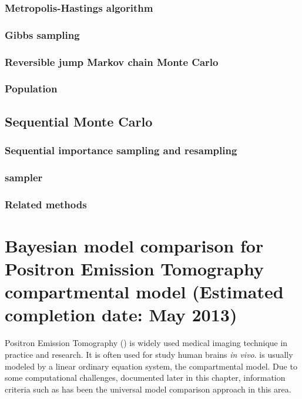 \documentclass[11pt, bib, fontset = Minion]{marticle}
\def\finish#1{(Estimated completion date: #1 2013)}
\begin{document}
\subsubsection{Metropolis-Hastings algorithm}

\subsubsection{Gibbs sampling}

\subsubsection{Reversible jump Markov chain Monte Carlo}

\subsubsection{Population \mcmc}

\subsection{Sequential Monte Carlo}

\subsubsection{Sequential importance sampling and resampling}

\subsubsection{\smc sampler}

\subsubsection{Related methods}

\section{Bayesian model comparison for Positron Emission Tomography
  compartmental model \finish{May}}

Positron Emission Tomography (\pet) is widely used medical imaging technique
in practice and research. It is often used for study human brains \emph{in
  vivo}. \pet is usually modeled by a linear ordinary equation system, the
compartmental model. Due to some computational challenges, documented later in
this chapter, information criteria such as \aic has been the universal model
comparison approach in this area.
\end{document}
